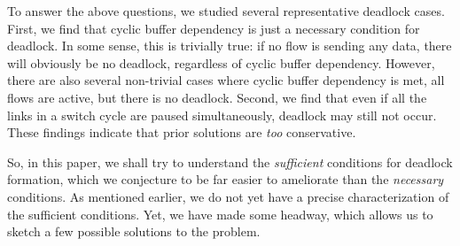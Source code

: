 To answer the above questions, we studied several representative deadlock cases.
First, we find that cyclic buffer dependency is
just a necessary condition for deadlock. In some sense, this is trivially true:
if no flow is sending any data, there will obviously be no deadlock, regardless
of cyclic buffer dependency.  However, there are also several non-trivial cases
where cyclic buffer dependency is met, all flows are active, but there is no
deadlock.  Second, we find that even if all the links in a switch cycle are
paused simultaneously, deadlock may still not occur.  These findings
indicate that prior solutions are {\em too} conservative. 

So, in this paper, we shall try to understand the {\em sufficient} conditions
for deadlock formation, which we conjecture to be far easier to ameliorate than
the {\em necessary} conditions. As mentioned earlier, we do not yet have a
precise characterization of the sufficient conditions. Yet, we have made some
headway, which allows us to sketch a few possible solutions to the problem.

